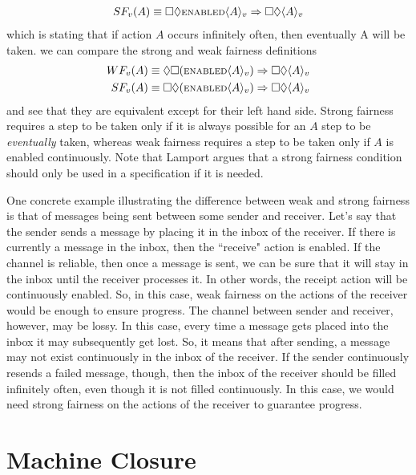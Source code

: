 \documentclass[11pt, oneside]{article}   	%
\begin{document}
\begin{align*}
SF_v(A) \equiv \square \lozenge \text{\scriptsize ENABLED} \langle A \rangle _v \Rightarrow \square \Diamond \langle A \rangle _v
\end{align*}
which is stating that if action $A$ occurs infinitely often, then eventually A will be taken. we can compare the strong and weak fairness definitions
\begin{align*}
WF_v(A) &\equiv 
\Diamond \square (\text{\scriptsize ENABLED} \langle A \rangle _v) \Rightarrow \square \Diamond \langle A \rangle _v \\
SF_v(A) &\equiv \square \lozenge (\text{\scriptsize ENABLED} \langle A \rangle _v ) \Rightarrow \square \Diamond \langle A \rangle _v
\end{align*}
and see that they are equivalent except for their left hand side. Strong fairness requires a step to be taken only if it is always possible for an $A$ step to be \textit{eventually} taken, whereas weak fairness requires a step to be taken only if $A$ is enabled continuously. Note that Lamport argues that a strong fairness condition should only be used in a specification if it is needed.

One concrete example illustrating the difference between weak and strong fairness is that of messages being sent between some sender and receiver. Let's say that the sender sends a message by placing it in the inbox of the receiver. If there is currently a message in the inbox, then the ``receive" action is enabled. If the channel is reliable, then once a message is sent, we can be sure that it will stay in the inbox until the receiver processes it. In other words, the receipt action will be continuously enabled. So, in this case, weak fairness on the actions of the receiver would be enough to ensure progress. The channel between sender and receiver, however, may be lossy. In this case, every time a message gets placed into the inbox it may subsequently get lost. So, it means that after sending, a message may not exist continuously in the inbox of the receiver. If the sender continuously resends a failed message, though, then the inbox of the receiver should be filled infinitely often, even though it is not filled continuously. In this case, we would need strong fairness on the actions of the receiver to guarantee progress.


\section*{Machine Closure}
\end{document}
